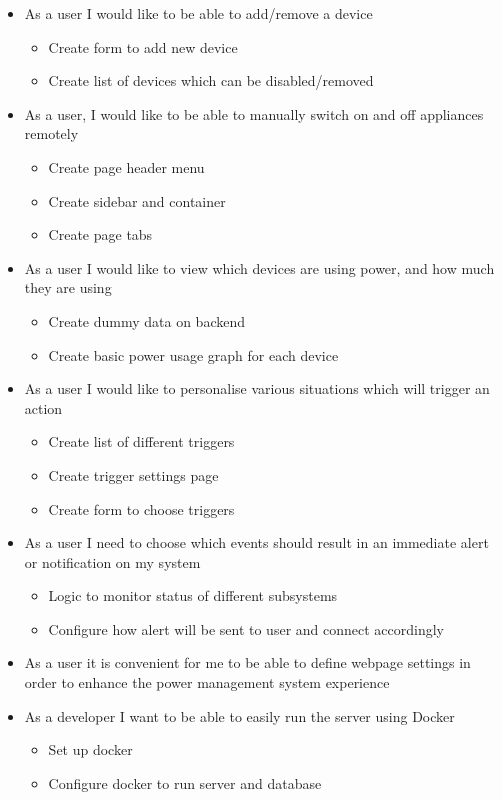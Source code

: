 \documentclass[10pt,twocolumn]{witseiepaper}
\begin{document}
	\begin{itemize}
		\item As a user I would like to be able to add/remove a device
		\begin{itemize}
			\item Create form to add new device
			\item Create list of devices which can be disabled/removed
		\end{itemize}
		\item As a user, I would like to be able to manually switch on and off appliances remotely
		\begin{itemize}
			\item Create page header menu
			\item Create sidebar and container
			\item Create page tabs
		\end{itemize}
		\item As a user I would like to view which devices are using power, and how much they are using
		\begin{itemize}
			\item Create dummy data on backend
			\item Create basic power usage graph for each device
		\end{itemize}
		\item As a user I would like to personalise various situations which will trigger an action
		\begin{itemize}
			\item Create list of different triggers 
			\item Create trigger settings page 
			\item Create form to choose triggers
		\end{itemize}
		\item As a user I need to choose which events should result in an immediate alert or notification on my system
		\begin{itemize}
			\item Logic to monitor status of different subsystems
			\item Configure how alert will be sent to user and connect accordingly
		\end{itemize}
		\item As a user it is convenient for me to be able to define webpage settings in order to enhance the power management system experience
		\item As a developer I want to be able to easily run the server using Docker
		\begin{itemize}
			\item Set up docker
			\item Configure docker to run server and database
		\end{itemize}
	\end{itemize}
	
\end{document}
